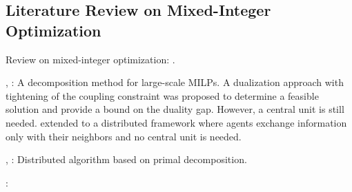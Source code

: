 \documentclass[twocolumn,amsthm]{autart}%
\theoremstyle{definition}
\theoremstyle{plain}
\begin{document}
\subsection{Literature Review on Mixed-Integer Optimization}

Review on mixed-integer optimization: \cite[Sec. 5.2]{ioan2021mixed}.

 




\cite{vujanic2016decomposition}, \cite{falsone2019decentralized}: A decomposition method for large-scale MILPs. 
A dualization approach with tightening of the coupling constraint was proposed to determine a feasible solution and provide a bound on the duality gap.
However, a central unit is still needed.
\cite{falsone2018distributed} extended to a distributed framework where agents exchange information only with their neighbors and no central unit is needed.

\cite{camisa2018primal}, \cite{camisa2021distributed}: 
Distributed algorithm based on primal decomposition.


\cite{testa2019distributed}:

\end{document}
